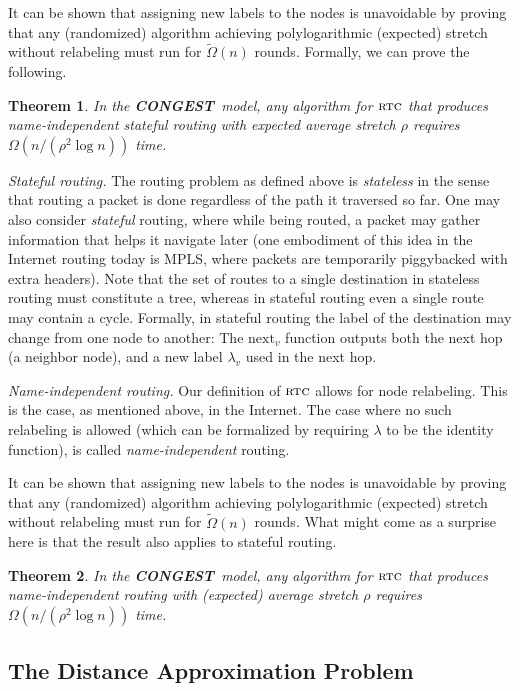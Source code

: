 \documentclass[letterpaper,11pt]{article}
\newtheorem{theorem}{Theorem}[section]
\newcommand{\CONGEST}{\textbf{CONGEST}}
\newcommand{\Next}{\mathrm{next}}
\newcommand{\rtc}{\textsc{rtc}}
\begin{document}
It can be shown that assigning new labels to the nodes is
unavoidable by proving that any (randomized) algorithm achieving polylogarithmic
(expected) stretch without relabeling must run for $\tilde\Omega(n)$ rounds.
Formally, we can prove the following.
\begin{theorem}
In the \CONGEST\ model, any algorithm for $\rtc$ that produces
name-independent stateful routing with expected average stretch 
$\rho$ requires $\Omega(n/(\rho^2\log n))$ time.
\end{theorem}

\emph{Stateful routing.} The routing problem as defined above is
\emph{stateless} in the sense that routing a packet is done regardless of the
path it traversed so far.  One may also consider \emph{stateful} routing, where
while being routed, a packet may gather information that helps it navigate later
(one embodiment of this idea in the Internet routing today is MPLS, where
packets are temporarily piggybacked with extra headers). Note that the set of
routes to a single destination in stateless routing must constitute a tree,
whereas in stateful routing even a single route may contain a cycle. Formally,
in stateful routing the label of the destination may change from one node to
another: The $\Next_v$ function outputs both the next hop (a neighbor node), and
a new label $\lambda_v$ used in the next hop.

\emph{Name-independent routing.} Our definition of $\rtc$ allows for node
relabeling. This is the case, as mentioned above, in the Internet. The case
where no such relabeling is allowed (which can be formalized by requiring
$\lambda$ to be the identity function), is called \emph{name-independent}
routing.

It can be shown that assigning new labels to the nodes is unavoidable by proving
that any (randomized) algorithm achieving polylogarithmic (expected) stretch
without relabeling must run for $\tilde\Omega(n)$ rounds. What might come as a
surprise here is that the result also applies to stateful routing.
\begin{theorem}
In the \CONGEST\ model, any algorithm for $\rtc$ that produces
name-independent routing with (expected) average stretch $\rho$ requires
$\Omega(n/(\rho^2\log n))$ time.
\end{theorem}



\subsection{The Distance Approximation Problem}
\end{document}
